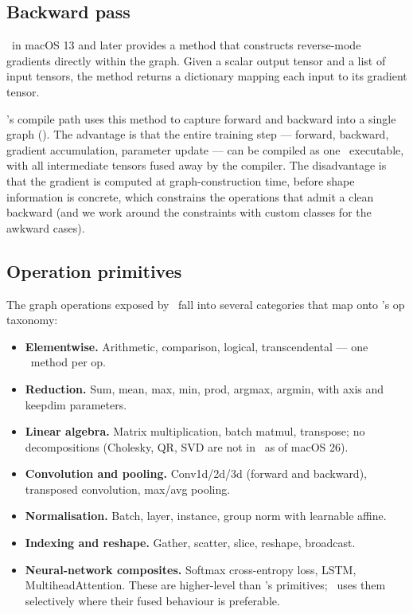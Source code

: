 \subsection{Backward pass}
\label{ssec:metal_mpsgraph:backward}

\MPSGraph\ in macOS 13 and later provides a
 method that
constructs reverse-mode gradients directly within the graph. Given
a scalar output tensor and a list of input tensors, the method
returns a dictionary mapping each input to its gradient tensor.

\Lucid's compile path uses this method to capture forward and
backward into a single graph
(). The advantage is that the entire
training step --- forward, backward, gradient accumulation, parameter
update --- can be compiled as one \MPSGraph\ executable, with all
intermediate tensors fused away by the compiler. The disadvantage
is that the gradient is computed at graph-construction time, before
shape information is concrete, which constrains the operations that
admit a clean backward (and we work around the constraints with
custom  classes for the awkward cases).

\subsection{Operation primitives}
\label{ssec:metal_mpsgraph:op_primitives}

The graph operations exposed by \MPSGraph\ fall into several
categories that map onto \Lucid's op taxonomy:

\begin{itemize}
  \item \textbf{Elementwise.} Arithmetic, comparison, logical,
    transcendental --- one \MPSGraph\ method per op.
  \item \textbf{Reduction.} Sum, mean, max, min, prod, argmax,
    argmin, with axis and keepdim parameters.
  \item \textbf{Linear algebra.} Matrix multiplication, batch
    matmul, transpose; no decompositions (Cholesky, QR, SVD are
    not in \MPSGraph\ as of macOS 26).
  \item \textbf{Convolution and pooling.} Conv1d/2d/3d (forward and
    backward), transposed convolution, max/avg pooling.
  \item \textbf{Normalisation.} Batch, layer, instance, group norm
    with learnable affine.
  \item \textbf{Indexing and reshape.} Gather, scatter, slice,
    reshape, broadcast.
  \item \textbf{Neural-network composites.} Softmax cross-entropy
    loss, LSTM, MultiheadAttention. These are higher-level than
    \MLX's primitives; \Lucid\ uses them selectively where their
    fused behaviour is preferable.
\end{itemize}


